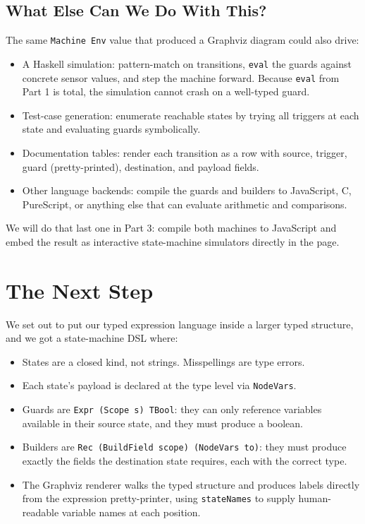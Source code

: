 \documentclass[]{article}
\begin{document}
\subsection{What Else Can We Do With This?}\label{what-else-can-we-do-with-this}

The same \texttt{Machine\ Env} value that produced a Graphviz diagram could also
drive:

\begin{itemize}
\tightlist
\item
  A Haskell simulation: pattern-match on transitions, \texttt{eval} the guards
  against concrete sensor values, and step the machine forward. Because
  \texttt{eval} from Part 1 is total, the simulation cannot crash on a
  well-typed guard.
\item
  Test-case generation: enumerate reachable states by trying all triggers at
  each state and evaluating guards symbolically.
\item
  Documentation tables: render each transition as a row with source, trigger,
  guard (pretty-printed), destination, and payload fields.
\item
  Other language backends: compile the guards and builders to JavaScript, C,
  PureScript, or anything else that can evaluate arithmetic and comparisons.
\end{itemize}

We will do that last one in Part 3: compile both machines to JavaScript and
embed the result as interactive state-machine simulators directly in the page.

\section{The Next Step}\label{the-next-step}

We set out to put our typed expression language inside a larger typed structure,
and we got a state-machine DSL where:

\begin{itemize}
\tightlist
\item
  States are a closed kind, not strings. Misspellings are type errors.
\item
  Each state's payload is declared at the type level via \texttt{NodeVars}.
\item
  Guards are \texttt{Expr\ (Scope\ s)\ TBool}: they can only reference variables
  available in their source state, and they must produce a boolean.
\item
  Builders are \texttt{Rec\ (BuildField\ scope)\ (NodeVars\ to)}: they must
  produce exactly the fields the destination state requires, each with the
  correct type.
\item
  The Graphviz renderer walks the typed structure and produces labels directly
  from the expression pretty-printer, using \texttt{stateNames} to supply
  human-readable variable names at each position.
\end{itemize}
\end{document}
